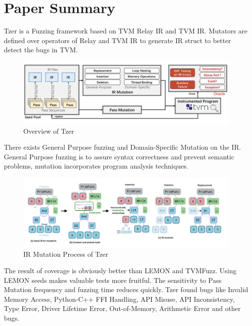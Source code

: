 \documentclass[conference]{IEEEtran}
\begin{document}
\section{Paper Summary}
Tzer is a Fuzzing framework based on TVM Relay IR and TVM IR. Mutators are defined over operators of Relay and TVM IR to generate IR struct to better detect the bugs in TVM.
\begin{figure}[htbp]
    \centering
    \includegraphics[width=\columnwidth]{./tzer_overview.png}
    \caption{Overview of Tzer}
  \end{figure}
There exists General Purpose fuzzing and Domain-Specific Mutation on the IR.
General Purpose fuzzing is to assure syntax correctness and prevent semantic problems, mutation incorporates program analysis techniques.

\begin{figure}[htbp]
    \centering
    \includegraphics[width=\columnwidth]{./mutation_process.png}
    \caption{IR Mutation Process of Tzer}
  \end{figure}
  The result of coverage is obviously better than LEMON and TVMFuzz. Using LEMON seeds makes valuable tests more fruitful. The sensitivity to Pass Mutation frequency and fuzzing time reduces quickly. Tzer found bugs like  Invalid Memory Access,  Python-C++ FFI Handling, API Misuse, API Inconsistency,  Type Error, Driver Lifetime Error, Out-of-Memory, Arithmetic Error and other bugs.
\end{document}
